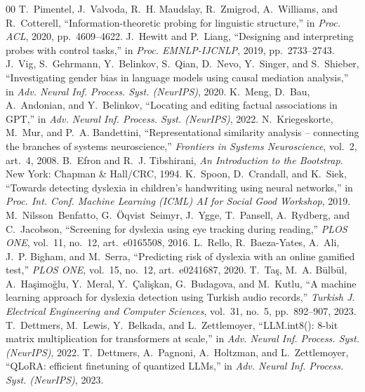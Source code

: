 \documentclass[preprint,12pt]{elsarticle}
\begin{document}
\begin{thebibliography}{00}
 T.~Pimentel, J.~Valvoda, R.~H. Maudslay, R.~Zmigrod, A.~Williams, and R.~Cotterell, ``Information-theoretic probing for linguistic structure,'' in \emph{Proc. ACL}, 2020, pp.~4609--4622.
 J.~Hewitt and P.~Liang, ``Designing and interpreting probes with control tasks,'' in \emph{Proc. EMNLP-IJCNLP}, 2019, pp.~2733--2743.
 J.~Vig, S.~Gehrmann, Y.~Belinkov, S.~Qian, D.~Nevo, Y.~Singer, and S.~Shieber, ``Investigating gender bias in language models using causal mediation analysis,'' in \emph{Adv. Neural Inf. Process. Syst. (NeurIPS)}, 2020.
 K.~Meng, D.~Bau, A.~Andonian, and Y.~Belinkov, ``Locating and editing factual associations in GPT,'' in \emph{Adv. Neural Inf. Process. Syst. (NeurIPS)}, 2022.
 N.~Kriegeskorte, M.~Mur, and P.~A. Bandettini, ``Representational similarity analysis -- connecting the branches of systems neuroscience,'' \emph{Frontiers in Systems Neuroscience}, vol.~2, art.~4, 2008.
 B.~Efron and R.~J. Tibshirani, \emph{An Introduction to the Bootstrap}. New York: Chapman \& Hall/CRC, 1994.
 K.~Spoon, D.~Crandall, and K.~Siek, ``Towards detecting dyslexia in children's handwriting using neural networks,'' in \emph{Proc. Int. Conf. Machine Learning (ICML) AI for Social Good Workshop}, 2019.
 M.~Nilsson~Benfatto, G.~\"Oqvist~Seimyr, J.~Ygge, T.~Pansell, A.~Rydberg, and C.~Jacobson, ``Screening for dyslexia using eye tracking during reading,'' \emph{PLOS ONE}, vol.~11, no.~12, art.~e0165508, 2016.
 L.~Rello, R.~Baeza-Yates, A.~Ali, J.~P. Bigham, and M.~Serra, ``Predicting risk of dyslexia with an online gamified test,'' \emph{PLOS ONE}, vol.~15, no.~12, art.~e0241687, 2020.
 T.~Ta\c{s}, M.~A. B\"ulb\"ul, A.~Ha\c{s}imo\u{g}lu, Y.~Meral, Y.~\c{C}ali\c{s}kan, G.~Budagova, and M.~Kutlu, ``A machine learning approach for dyslexia detection using Turkish audio records,'' \emph{Turkish J. Electrical Engineering and Computer Sciences}, vol.~31, no.~5, pp.~892--907, 2023.
 T.~Dettmers, M.~Lewis, Y.~Belkada, and L.~Zettlemoyer, ``LLM.int8(): 8-bit matrix multiplication for transformers at scale,'' in \emph{Adv. Neural Inf. Process. Syst. (NeurIPS)}, 2022.
 T.~Dettmers, A.~Pagnoni, A.~Holtzman, and L.~Zettlemoyer, ``QLoRA: efficient finetuning of quantized LLMs,'' in \emph{Adv. Neural Inf. Process. Syst. (NeurIPS)}, 2023.
\end{thebibliography}
\end{document}
